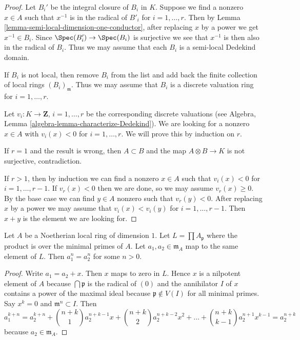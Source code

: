 \begin{proof}
Let $B_i'$ be the integral closure of $B_i$ in $K$. Suppose we find a
nonzero $x \in A$ such that $x^{-1}$ is in the radical of $B'_i$ for
$i = 1, \ldots, r$. Then by
Lemma \ref{lemma-semi-local-dimension-one-conductor},
after replacing $x$ by a power we get $x^{-1} \in B_i$.
Since $\Spec(B'_i) \to \Spec(B_i)$ is surjective we
see that $x^{-1}$ is then also in the radical of $B_i$.
Thus we may assume that each $B_i$ is a semi-local Dedekind domain.

\medskip\noindent
If $B_i$ is not local, then remove $B_i$ from the list and
add back the finite collection of local rings $(B_i)_\mathfrak m$.
Thus we may assume that $B_i$ is a discrete valuation ring for
$i = 1, \ldots, r$.

\medskip\noindent
Let $v_i : K \to \mathbf{Z}$, $i = 1, \ldots, r$
be the corresponding discrete valuations (see
Algebra, Lemma \ref{algebra-lemma-characterize-Dedekind}).
We are looking for a nonzero $x \in A$ with $v_i(x) < 0$ for
$i = 1, \ldots, r$. We will prove this by induction on $r$.

\medskip\noindent
If $r = 1$ and the result is wrong, then $A \subset B$ and the map
$A \otimes B \to K$ is not surjective, contradiction.

\medskip\noindent
If $r > 1$, then by induction we can find a nonzero $x \in A$ such that
$v_i(x) < 0$ for $i = 1, \ldots, r - 1$. If $v_r(x) < 0$ then we are
done, so we may assume $v_r(x) \geq 0$. By the base case we can find
$y \in A$ nonzero such that $v_r(y) < 0$. After replacing $x$ by a
power we may assume that $v_i(x) < v_i(y)$ for $i = 1, \ldots, r - 1$.
Then $x + y$ is the element we are looking for.
\end{proof}

\begin{lemma}
\label{lemma-power-equal}
Let $A$ be a Noetherian local ring of dimension $1$.
Let $L = \prod A_\mathfrak p$ where the product is over
the minimal primes of $A$. Let $a_1, a_2 \in \mathfrak m_A$
map to the same element of $L$. Then $a_1^n = a_2^n$ for
some $n > 0$.
\end{lemma}

\begin{proof}
Write $a_1 = a_2 + x$. Then $x$ maps to zero in $L$. Hence
$x$ is a nilpotent element of $A$ because $\bigcap \mathfrak p$
is the radical of $(0)$ and the annihilator $I$ of $x$ contains
a power of the maximal ideal because $\mathfrak p \not \in V(I)$
for all minimal primes. Say $x^k = 0$ and $\mathfrak m^n \subset I$.
Then
$$
a_1^{k + n} = a_2^{k + n} + {n + k \choose 1} a_2^{n + k - 1} x +
{n + k \choose 2} a_2^{n + k - 2} x^2 + \ldots +
{n + k \choose k - 1} a_2^{n + 1} x^{k - 1} = a_2^{n + k}
$$
because $a_2 \in \mathfrak m_A$.
\end{proof}

